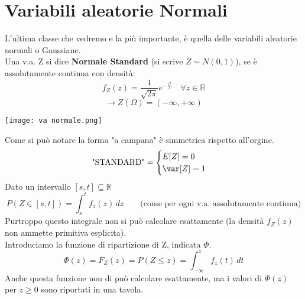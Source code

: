 

\section{Variabili aleatorie Normali}
L'ultima classe che vedremo e la più importante, è quella delle variabili aleatorie
normali o Gaussiane.
\\ Una v.a. Z si dice \textbf{Normale Standard} (si scrive $Z \sim N(0,1)$), se è
assolutamente continua con densità:
\begin{equation*}
	f_Z(z)= \frac{1}{\sqrt{2 \pi}} e^{-\frac{z^2}{2}}
	\quad \forall z \in \mathbb{R}
\end{equation*}
\begin{equation*}
	\rightarrow Z(\Omega) = (-\infty, + \infty)
\end{equation*}
\begin{center}
	\texttt{[image: va normale.png]}
\end{center}
Come si può notare la forma "a campana" è simmetrica rispetto all'orgine.
\begin{equation}
	\text{"STANDARD"} =
	\begin{cases}
		E[Z] = 0 \\
		\var[Z] = 1
	\end{cases}
\end{equation}
Dato un intervallo $[s,t] \subseteq \mathbb{R}$
\begin{equation*}
	P(Z\in [s,t]) = \int_{s}^{t} f_z(z)\,dz \qquad
	\text{(come per ogni v.a. assolutamente continua)}
\end{equation*}
Purtroppo questo integrale non si può calcolare esattamente (la densità $f_Z(z)$
non ammette primitiva esplicita).
\\ Introduciamo la funzione di ripartizione di Z, indicata $\Phi$.
\begin{equation*}
	\Phi(z) = F_Z(z) = P(Z \leq z) = \int_{-\infty}^{z}f_z(t)\,dt
\end{equation*}
Anche questa funzione non di può calcolare esattamente, ma i valori di $\Phi(z)$ per
$z \geq 0$ sono riportati in una tavola.
